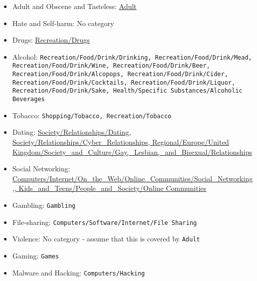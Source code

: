 \documentclass{bmcart}
\begin{document}
\begin{backmatter}
\begin{itemize}
	\item Adult and Obscene and Tasteless: \url{Adult}
	\item Hate and Self-harm: No category
	\item Drugs: \url{Recreation/Drugs}
	\item Alcohol: \texttt{Recreation/Food/Drink/Drinking, Recreation/Food/Drink/Mead, Recreation/Food/Drink/Wine, Recreation/Food/Drink/Beer, Recreation/Food/Drink/Alcopops, Recreation/Food/Drink/Cider, Recreation/Food/Drink/Cocktails, Recreation/Food/Drink/Liquor, Recreation/Food/Drink/Sake, Health/Specific Substances/Alcoholic Beverages}
	\item Tobacco: \texttt{Shopping/Tobacco, Recreation/Tobacco}
	\item Dating: \url{Society/Relationships/Dating, Society/Relationships/Cyber_Relationships, Regional/Europe/United Kingdom/Society_and_Culture/Gay,_Lesbian,_and_Bisexual/Relationships}
	\item Social Networking: \url{Computers/Internet/On_the_Web/Online_Communities/Social_Networking,, Kids_and_Teens/People_and_Society/Online Communities}
	\item Gambling: \texttt{Gambling}
	\item File-sharing: \texttt{Computers/Software/Internet/File Sharing}
	\item Violence: No category - assume that this is covered by \texttt{Adult}
	\item Gaming: \texttt{Games}
	\item Malware and Hacking: \texttt{Computers/Hacking}
\end{itemize}

\end{backmatter}
\end{document}
